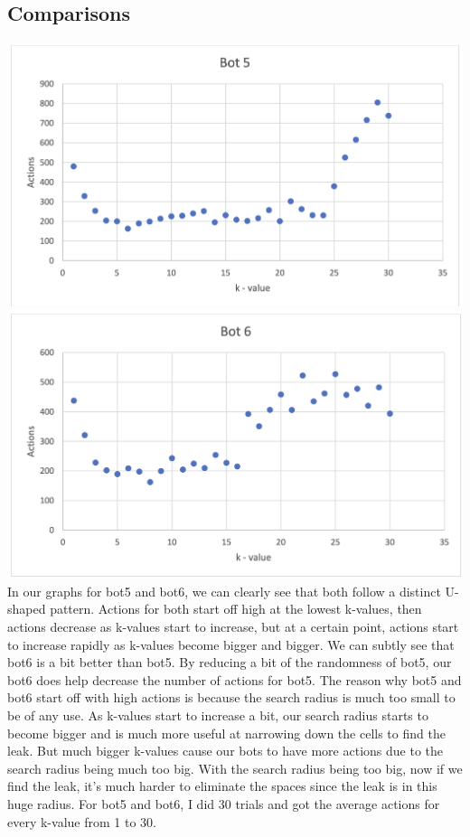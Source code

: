 \documentclass[12pt]{article}
\begin{document}
 
\subsection*{Comparisons}
\includegraphics*[scale=0.5]{Bot5} \\
\includegraphics*[scale=0.5]{Bot6}\\
In our graphs for bot5 and bot6, we can clearly see that both follow a distinct U-shaped pattern. 
Actions for both start off high at the lowest k-values, then actions decrease as k-values start to increase, 
but at a certain point, actions start to increase rapidly as k-values become bigger and bigger. 
We can subtly see that bot6 is a bit better than bot5. By reducing a bit of the randomness of bot5, our 
bot6 does help decrease the number of actions for bot5. The reason why bot5 and bot6 start off with high 
actions is because the search radius is much too small to be of any use. As k-values start to increase a bit, 
our search radius starts to become bigger and is much more useful at narrowing down the cells to find the leak. 
But much bigger k-values cause our bots to have more actions due to the search radius being much too big. With 
the search radius being too big, now if we find the leak, it's much harder to eliminate the spaces since the 
leak is in this huge radius. For bot5 and bot6, I did 30 trials and got the average actions for every k-value 
from 1 to 30. 
\end{document}
